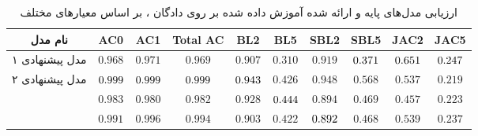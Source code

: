 \begin{table}[!htb]
	\centering
	\caption{
		ارزیابی مدل‌های پایه و ارائه شده آموزش داده شده بر روی دادگان ، بر اساس معیار‌های مختلف}
	\label{table:amazon_result}
	\small\tabcolsep=0.07cm
	\begin{tabular}{||c||c c c|c c|c c|c c||}\hline\hline نام مدل & AC0                        & AC1                        & Total AC                   & BL2                        & BL5                        & SBL2                       & SBL5                       & JAC2                       & JAC5                       \\
		\hline\hline
		مدل پیشنهادی ۱
                                        & $0.968$                    & $0.971$                    & $0.969$                    & $0.907$                    & $0.310$                    & $0.919$                    & $\cellcolor{gray!25}0.371$ & $\cellcolor{gray!25}0.651$ & $\cellcolor{gray!25}0.247$ \\
		\hline
		مدل پیشنهادی ۲
                                         & $\cellcolor{gray!25}0.999$ & $\cellcolor{gray!25}0.999$ & $\cellcolor{gray!25}0.999$ & $\cellcolor{gray!25}0.943$ & $0.426$                    & $0.948$                    & $0.568$                    & $0.537$                    & $0.219$                    \\
		\hline
		\towardctg{}                           & $0.983$                    & $0.980$                    & $0.982$                    & $0.928$                    & $\cellcolor{gray!25}0.444$ & $0.894$                    & $0.469$                    & $0.457$                    & $0.223$                    \\
		\hline
		\sentigan{}                                          & $0.991$                    & $0.996$                    & $0.994$                    & $0.903$                    & $0.422$                    & $\cellcolor{gray!25}0.892$ & $0.468$                    & $0.539$                    & $0.237$                    \\
		\hline
		\hline\end{tabular}\normalsize
\end{table}

